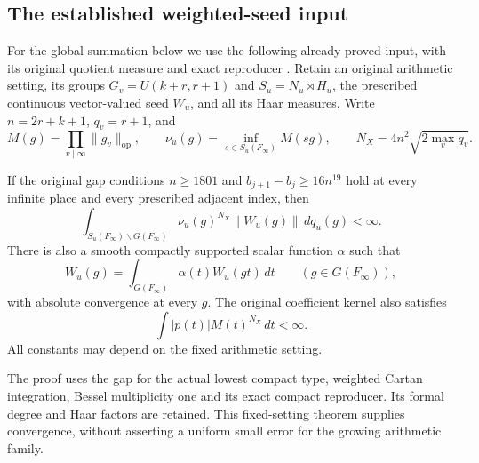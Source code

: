 \subsection{The established weighted-seed input}
\label{global-gram-established-seed}

For the global summation below we use the following already proved
input, with its original quotient measure and exact reproducer
\cite{global-gram-established-seed-reference}.
Retain an original arithmetic setting, its groups
$G_v=U(k+r,r+1)$ and $S_u=N_u\rtimes H_u$, the prescribed
continuous vector-valued seed $W_u$, and all its Haar measures.
Write $n=2r+k+1$, $q_v=r+1$, and
\[
 M(g)=\prod_{v\mid\infty}\|g_v\|_{\mathrm{op}},\qquad
 \nu_u(g)=\inf_{s\in S_u(F_\infty)}M(sg),\qquad
 N_X=4n^2\sqrt{2\max_vq_v}.
\]

\begin{theorem}
\label{actual-seed-decay-theorem}
If the original gap conditions
$n\ge1801$ and $b_{j+1}-b_j\ge16n^{19}$ hold at every
infinite place and every prescribed adjacent index, then
\[
 \int_{S_u(F_\infty)\backslash G(F_\infty)}
       \nu_u(g)^{N_X}\|W_u(g)\|\,dq_u(g)<\infty.
\]
There is also a smooth compactly supported scalar function $\alpha$
such that
\[
 W_u(g)=\int_{G(F_\infty)}\alpha(t)W_u(gt)\,dt
 \qquad(g\in G(F_\infty)),
\]
with absolute convergence at every $g$. The original coefficient
kernel also satisfies
\[
                  \int |p(t)|M(t)^{N_X}\,dt<\infty.
\]
All constants may depend on the fixed arithmetic setting.
\end{theorem}

The proof uses the gap for the actual lowest compact type,
weighted Cartan integration, Bessel multiplicity one and its exact
compact reproducer. Its formal degree and Haar factors are retained.
This fixed-setting theorem supplies convergence, without asserting
a uniform small error for the growing arithmetic family.
